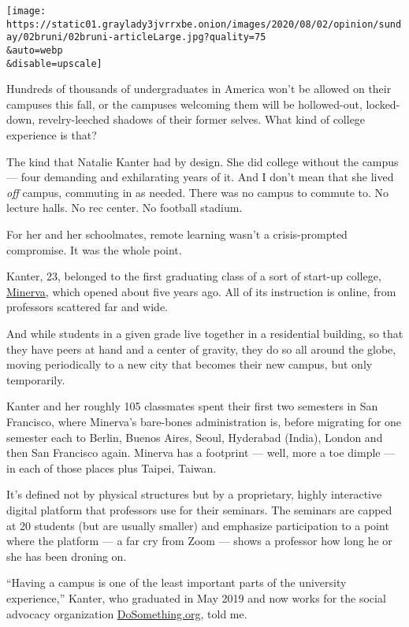 \texttt{[image: https://static01.graylady3jvrrxbe.onion/images/2020/08/02/opinion/sunday/02bruni/02bruni-articleLarge.jpg?quality=75\\\&auto=webp\\\&disable=upscale]}

Hundreds of thousands of undergraduates in America won't be allowed on
their campuses this fall, or the campuses welcoming them will be
hollowed-out, locked-down, revelry-leeched shadows of their former
selves. What kind of college experience is that?

The kind that Natalie Kanter had by design. She did college without the
campus --- four demanding and exhilarating years of it. And I don't mean
that she lived \emph{off} campus, commuting in as needed. There was no
campus to commute to. No lecture halls. No rec center. No football
stadium.

For her and her schoolmates, remote learning wasn't a crisis-prompted
compromise. It was the whole point.

Kanter, 23, belonged to the first graduating class of a sort of start-up
college,
\href{https://www.minervaproject.com/solutions/educational-solutions/}{Minerva},
which opened about five years ago. All of its instruction is online,
from professors scattered far and wide.

And while students in a given grade live together in a residential
building, so that they have peers at hand and a center of gravity, they
do so all around the globe, moving periodically to a new city that
becomes their new campus, but only temporarily.

Kanter and her roughly 105 classmates spent their first two semesters in
San Francisco, where Minerva's bare-bones administration is, before
migrating for one semester each to Berlin, Buenos Aires, Seoul,
Hyderabad (India), London and then San Francisco again. Minerva has a
footprint --- well, more a toe dimple --- in each of those places plus
Taipei, Taiwan.

It's defined not by physical structures but by a proprietary, highly
interactive digital platform that professors use for their seminars. The
seminars are capped at 20 students (but are usually smaller) and
emphasize participation to a point where the platform --- a far cry from
Zoom --- shows a professor how long he or she has been droning on.

``Having a campus is one of the least important parts of the university
experience,'' Kanter, who graduated in May 2019 and now works for the
social advocacy organization
\href{https://www.dosomething.org/us}{DoSomething.org}, told me.

